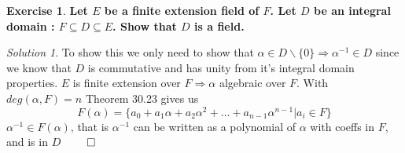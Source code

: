 \documentclass[a4paper,twoside=false,abstract=false,numbers=noenddot,
titlepage=false,headings=small,parskip=half,version=last]{scrartcl}
\theoremstyle{definition}
\newtheorem{exercise}{Exercise}
\theoremstyle{remark}
\newtheorem*{solution}{Solution}
\begin{document}
\begin{exercise}
{\bf
    Let $E$ be a finite extension field of $F$. Let $D$ be an integral domain :
    $F\subseteq D\subseteq E$. Show that $D$ is a field.
}
\end{exercise}
\begin{solution}
    To show this we only need to show that $\alpha \in D\backslash \{0\}
    \Rightarrow \alpha^{-1} \in D$ since we know that $D$ is commutative 
    and has unity from it's integral domain properties. 
    $E$ is finite extension over $F \Rightarrow \alpha$ algebraic over $F$.
    With $deg(\alpha,F)=n$ Theorem 30.23 gives us
    \begin{equation}
        F(\alpha) = \{ a_0+a_1\alpha+a_2\alpha^2+\dots+a_{n-1}\alpha^{n-1} |a_i\in F\}
    \end{equation}
    $\alpha^{-1}\in F(\alpha)$, that is $\alpha^{-1}$ can be written as a
    polynomial of $\alpha$ with coeffs in $F$, and is in $D$ $\qed$
\end{solution}

\end{document}
